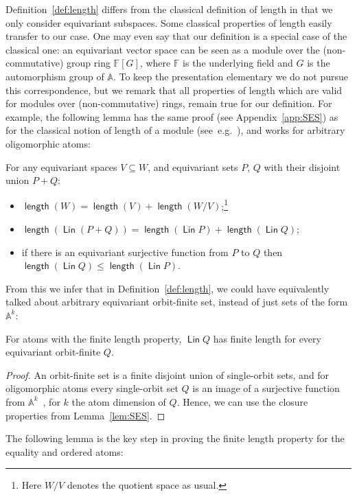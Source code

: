 \documentclass[10pt,a4paper]{amsart}
\numberwithin{equation}{section}
\newcommand{\atoms}{\mathbb A}
\DeclareMathOperator{\lin}{\mathsf{Lin}}
\DeclareMathOperator{\length}{\mathsf{length}}
\newcommand{\field}{\mathbb F}
\begin{document}
Definition~\ref{def:length} differs from the classical definition of length in that we only consider equivariant subspaces. Some classical properties of length  easily transfer to our case. One may even say that our definition is a special case of the classical one: an equivariant vector space can be seen as a module over the (non-commutative) group ring $\field[G]$, where $\field$ is the underlying field and $G$ is the automorphism group of $\atoms$. To keep the presentation elementary we do not pursue this correspondence, but we remark that all properties of length which are valid for modules over (non-commutative) rings, remain true for our definition.
For example, the following lemma has the same proof (see Appendix~\ref{app:SES}) 
as for the classical notion of length of a module (see~e.g.~\cite[Prop.~4.12]{goodearl_warfield}), and works for arbitrary oligomorphic atoms:
\begin{lemma}\label{lem:SES}
For any equivariant spaces $V\subseteq W$, and equivariant sets $P$, $Q$ with their disjoint union $P+Q$: \begin{itemize}
\item[(i)]	$\length(W)=\length(V)+\length(W/V)$;\footnote{Here $W/V$ denotes the quotient space as usual.}
\item[(ii)]	$\length(\lin(P+Q)) = \length(\lin P) + \length(\lin Q)$;
\item[(iii)] if there is an equivariant surjective function from $P$ to $Q$ then $\length(\lin Q)\leq\length(\lin P)$.
\end{itemize}
\end{lemma} 

From this we infer that in Definition~\ref{def:length}, we could have equivalently talked about arbitrary equivariant orbit-finite set, instead of just sets of the form $\atoms^k$:
\begin{corollary} For  atoms with the finite length property,  $\lin Q$ has finite length for every equivariant orbit-finite  $Q$.
\end{corollary}
\begin{proof}
	An orbit-finite set is a finite disjoint union of single-orbit sets, and for oligomorphic atoms every single-orbit set $Q$ is an image of a surjective function from $\atoms^k$~\cite{BKL14}, for $k$ the atom dimension of $Q$.
	Hence, we can use the closure properties from Lemma~\ref{lem:SES}.
\end{proof}

The following lemma is the key step in proving the finite length property for the equality and ordered atoms:
\end{document}
